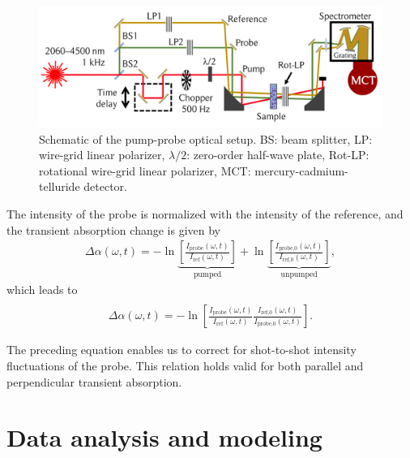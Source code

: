 \begin{figure}[t!]
	\centering
	\includegraphics[width=1.0\figwidth]{chapters/Chapter3_Methods2/Graphs/PumpProbeSetup.png} %
	\caption{Schematic of the pump-probe optical setup. BS:  beam splitter, LP: wire-grid linear polarizer, $\lambda/2$: zero-order half-wave plate, Rot-LP: rotational wire-grid linear polarizer, MCT: mercury-cadmium-telluride detector.}
	\label{PumpProbeSetup}
\end{figure}



The intensity of the probe is normalized with the intensity of the reference, and the transient absorption change is given by
\begin{eqnarray}
\Delta \alpha (\omega, t ) = - \ln   \underbrace{   \left[  \frac{I_\text{probe} (\omega,t)}{I_\text{ref} (\omega, t)}  \right] }_{\text{pumped}}  +  \ln  \underbrace{ \left[  \frac{I_\text{probe,0} (\omega,t)}{I_\text{ref,0} (\omega, t)}   \right] }_{\text{unpumped}} ,
\end{eqnarray}
which leads to 
\begin{eqnarray}
\nonumber \\
\Delta \alpha (\omega, t ) = - \ln \left[   \frac{I_\text{probe} (\omega,t)}{I_\text{ref} (\omega, t)}        \frac{I_\text{ref,0} (\omega, t)}{I_\text{probe,0} (\omega,t)}         \right] .
\end{eqnarray}

The preceding equation enables us to correct for shot-to-shot intensity fluctuations of the probe. This relation holds valid for both parallel and perpendicular transient absorption.


\section{Data analysis and modeling}\label{TRVSModel}


